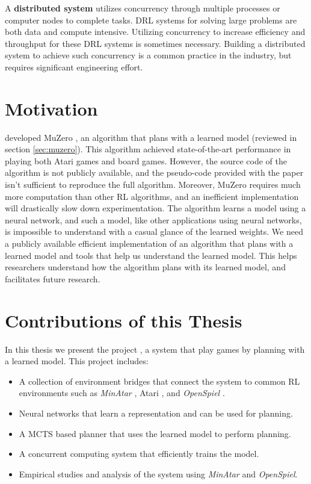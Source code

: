 A \textbf{distributed system} utilizes concurrency through multiple processes or computer nodes to complete tasks.
DRL systems for solving large problems are both data and compute intensive.
Utilizing concurrency to increase efficiency and throughput for these DRL systems is sometimes necessary.
Building a distributed system to achieve such concurrency is a common practice in the industry, but requires significant engineering effort.

\section{Motivation}
\citeauthor{MasteringAtariGo_Schrittwieser.Antonoglou.ea_2020} developed MuZero \cite{MasteringAtariGo_Schrittwieser.Antonoglou.ea_2020}, an algorithm that plans with a learned model (reviewed in section \ref{sec:muzero}).
This algorithm achieved state-of-the-art performance in playing both Atari games and board games.
However, the source code of the algorithm is not publicly available, and the pseudo-code provided with the paper isn't sufficient to reproduce the full algorithm.
Moreover, MuZero requires much more computation than other RL algorithms, and an inefficient implementation will drastically slow down experimentation.
The algorithm learns a model using a neural network, and such a model, like other applications using neural networks, is impossible to understand with a casual glance of the learned weights.
We need a publicly available efficient implementation of an algorithm that plans with a learned model and tools that help us understand the learned model.
This helps researchers understand how the algorithm plans with its learned model, and facilitates future research.

\section{Contributions of this Thesis}
In this thesis we present the project \textbf{\moozi}, a system that play games by planning with a learned model.
This project includes:
\begin{itemize}
    \item A collection of environment bridges that connect the system to common RL environments such as \textit{MinAtar} \cite{MasteringAtariGames_Ye.Liu.ea_2021}, Atari \cite{ArcadeLearningEnvironment_Bellemare.Naddaf.ea_2013}, and \textit{OpenSpiel} \cite{OpenSpielFrameworkReinforcement_Lanctot.Lockhart.ea_2020}.
    \item Neural networks that learn a representation and can be used for planning.
    \item A MCTS based planner that uses the learned model to perform planning.
    \item A concurrent computing system that efficiently trains the model.
    \item Empirical studies and analysis of the system using \textit{MinAtar} and \textit{OpenSpiel}.
\end{itemize}